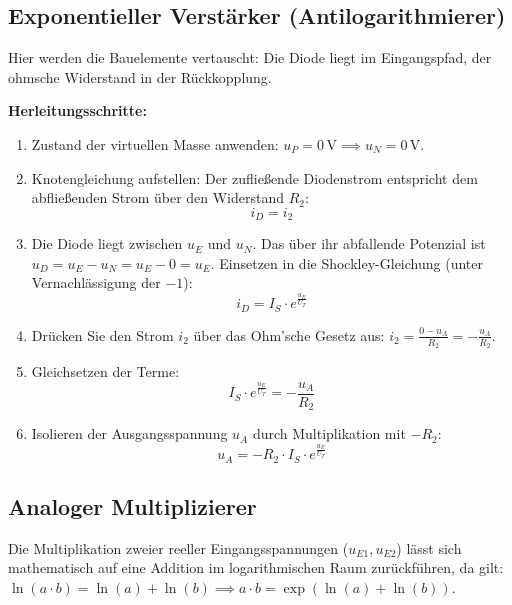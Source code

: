 \documentclass[11pt,a4paper]{article}
\begin{document}
\subsection{Exponentieller Verstärker (Antilogarithmierer)}
Hier werden die Bauelemente vertauscht: Die Diode liegt im Eingangspfad, der ohmsche Widerstand in der Rückkopplung.

\textbf{Herleitungsschritte:}
\begin{enumerate}
    \item Zustand der virtuellen Masse anwenden: $u_P = 0\,\text{V} \implies u_N = 0\,\text{V}$.
    \item Knotengleichung aufstellen: Der zufließende Diodenstrom entspricht dem abfließenden Strom über den Widerstand $R_2$:
    \begin{equation}
    i_D = i_2
    \end{equation}
    \item Die Diode liegt zwischen $u_E$ und $u_N$. Das über ihr abfallende Potenzial ist $u_D = u_E - u_N = u_E - 0 = u_E$. Einsetzen in die Shockley-Gleichung (unter Vernachlässigung der $-1$):
    \begin{equation}
    i_D = I_S \cdot e^{\frac{u_E}{U_T}}
    \end{equation}
    \item Drücken Sie den Strom $i_2$ über das Ohm'sche Gesetz aus: $i_2 = \frac{0 - u_A}{R_2} = -\frac{u_A}{R_2}$.
    \item Gleichsetzen der Terme:
    \begin{equation}
    I_S \cdot e^{\frac{u_E}{U_T}} = -\frac{u_A}{R_2}
    \end{equation}
    \item Isolieren der Ausgangsspannung $u_A$ durch Multiplikation mit $-R_2$:
    \begin{equation}
    u_A = -R_2 \cdot I_S \cdot e^{\frac{u_E}{U_T}}
    \end{equation}
\end{enumerate}

\subsection{Analoger Multiplizierer}
Die Multiplikation zweier reeller Eingangsspannungen ($u_{E1}, u_{E2}$) lässt sich mathematisch auf eine Addition im logarithmischen Raum zurückführen, da gilt: $\ln(a \cdot b) = \ln(a) + \ln(b) \implies a \cdot b = \exp(\ln(a) + \ln(b))$.
\end{document}
